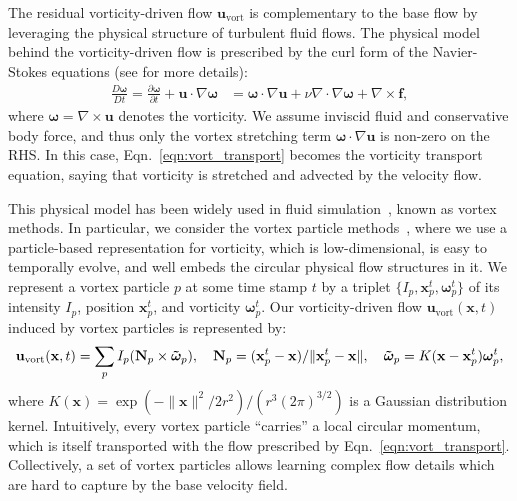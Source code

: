 \documentclass{article}
\newcommand{\eqn}[1]{Eqn.~\ref{#1}}
\begin{document}
The residual vorticity-driven flow $\mathbf{u}_\text{vort}$ is complementary to the base flow by leveraging the physical structure of turbulent fluid flows. The physical model behind the vorticity-driven flow is prescribed by the curl form of the Navier-Stokes equations (see \citet{cottet2000vortex} for more details):
\begin{align}\label{eqn:vort_transport}
    \frac{D\boldsymbol\omega}{Dt}=\frac{\partial\boldsymbol\omega}{\partial t}+\mathbf{u}\cdot\nabla\boldsymbol\omega &= \boldsymbol\omega\cdot\nabla\mathbf{u} + \nu\nabla\cdot\nabla\boldsymbol\omega + \nabla\times\mathbf{f},
\end{align}
where $\boldsymbol\omega=\nabla\times\mathbf{u}$ denotes the vorticity. We assume inviscid fluid and conservative body force, and thus only the vortex stretching term $\boldsymbol\omega\cdot\nabla\mathbf{u}$ is non-zero on the RHS. In this case, \eqn{eqn:vort_transport} becomes the vorticity transport equation, saying that vorticity is stretched and advected by the velocity flow.

This physical model has been widely used in fluid simulation~\citep{cottet2000vortex}, known as vortex methods. In particular, we consider the vortex particle methods~\citep{selle2005vortex}, where we use a particle-based representation for vorticity, which is low-dimensional, is easy to temporally evolve, and well embeds the circular physical flow structures in it. 
We represent a vortex particle $p$ at some time stamp $t$ by a triplet $\{I_p, \mathbf{x}^t_p, \boldsymbol{\omega}^t_p\}$ of its intensity $I_p$, position $\mathbf{x}^t_p$, and vorticity $\boldsymbol{\omega}^t_p$. Our vorticity-driven flow $\mathbf{u}_\text{vort}(\mathbf{x}, t)$ induced by vortex particles is represented by:
\begin{align}\label{eqn:vort2vel}
    \mathbf{u}_\text{vort}(\mathbf{x}, t) = \sum_p I_p(\mathbf{N}_p\times\mathbf{\Tilde{\boldsymbol\omega}}_p), \quad
    \mathbf{N}_p = (\mathbf{x}^t_p - \mathbf{x}) / \lVert \mathbf{x}^t_p - \mathbf{x}\rVert, \quad
    \mathbf{\Tilde{\boldsymbol\omega}}_p=K(\mathbf{x}-\mathbf{x}_p^t)\boldsymbol\omega_p^t,
\end{align}
where $K(\mathbf{x})=\exp(-\lVert \mathbf{x}\rVert^2/2r^2)/(r^3(2\pi)^{3/2})$ is a Gaussian distribution kernel. Intuitively, every vortex particle ``carries'' a local circular momentum, which is itself transported with the flow prescribed by \eqn{eqn:vort_transport}. Collectively, a set of vortex particles allows learning complex flow details which are hard to capture by the base velocity field.
\end{document}
